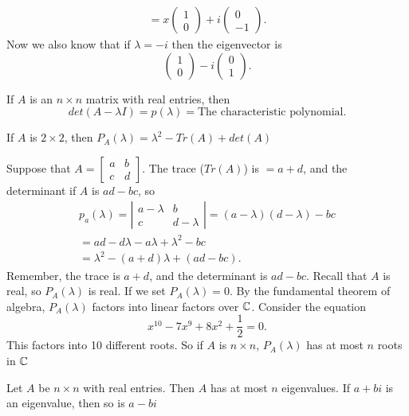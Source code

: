\begin{eg}
\begin{align*}
    =x\begin{pmatrix} 1\\0 \end{pmatrix} + i\begin{pmatrix} 0\\-1 \end{pmatrix} 
  .\end{align*}
  Now we also know that if $\lambda  = -i$ then the eigenvector is 
  \[
  \begin{pmatrix} 1\\0 \end{pmatrix} -i\begin{pmatrix} 0\\1 \end{pmatrix} 
  .\] 
\end{eg}
If $A$ is an $n\times n$ matrix with real entries, then 
\[
  det(A-\lambda I) = p(\lambda)= \text{The characteristic polynomial}
.\] 
\begin{note}
  If $A$ is $2\times 2$, then $P_A(\lambda)=\lambda^2-Tr(A)+det(A)$
\end{note}
Suppose that $A=\begin{bmatrix} a&b\\c&d \end{bmatrix}$. The trace ($Tr(A)$) is $=a+d$, and the determinant if $A$ is $ad-bc$, so 
\begin{align*}
  p_a(\lambda)=\left| \begin{matrix} a-\lambda&b\\c&d-\lambda \end{matrix} \right| 
  =(a-\lambda)(d-\lambda)-bc\\
  =ad-d\lambda-a\lambda+\lambda^2-bc\\
  =\lambda^2-(a+d)\lambda+(ad-bc)
.\end{align*}
Remember, the trace is $a+d$, and the determinant is $ad-bc$. Recall that $A$ is real, so $P_A(\lambda)$ is real. If we set $P_A(\lambda)=0$. By the fundamental theorem of algebra, $P_A(\lambda)$ factors into linear factors over $\mathbb{C}$. Consider the equation 
\[
x^{10}-7x^{9}+8x^2+\frac{1}{2}=0
.\] 
This factors into 10 different roots. So if $A$ is $n\times n$, $P_A(\lambda)$ has at most $n$ roots in $\mathbb{C}$
\begin{theorem}
  Let $A$ be $n\times n$ with real entries. Then $A$ has at most $n$ eigenvalues. If $a+bi$ is an eigenvalue, then so is $a-bi$
\end{theorem}
